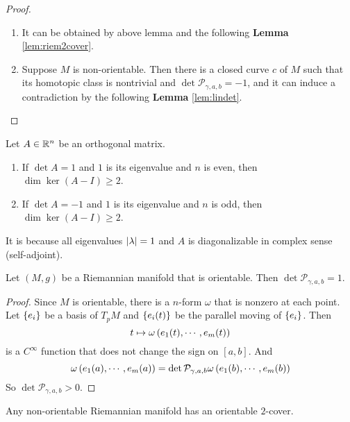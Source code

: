 \begin{enumerate}[label=\Roman{*}.]
\begin{proof}
\begin{enumerate}[label=(\arabic{*})]
			\item It can be obtained by above lemma and the following \textbf{Lemma} \ref{lem:riem2cover}.

			\item Suppose $M$ is non-orientable. Then there is a closed curve $c$ of $M$ such that its homotopic class is nontrivial and $\det \mathcal{P}_{\gamma,a,b} = -1$, and it can induce a contradiction by the following \textbf{Lemma} \ref{lem:lindet}.
		\end{enumerate}
	\end{proof}

	\begin{lem}\label{lem:lindet}
		Let $A \in \mathbb{R}^{n}$ be an orthogonal matrix.
		\begin{enumerate}[label=(\arabic{*})]
			\item If $\det A = 1$ and $1$ is its eigenvalue and $n$ is even, then $\dim \ker (A -I) \geq 2$. 
			\item If $\det A = -1$ and $1$ is its eigenvalue and $n$ is odd, then $\dim \ker (A - I) \geq 2$.
		\end{enumerate}
	\end{lem}
	\begin{rmk}
		It is because all eigenvalues $\left\lvert\lambda\right\lvert= 1$ and $A$ is diagonalizable in complex sense (self-adjoint).
	\end{rmk}

	\begin{lem}\label{lem:riemorein}
		Let $(M,g)$ be a Riemannian manifold that is orientable. Then $\det \mathcal{P}_{\gamma,a,b} = 1$.
	\end{lem}
	\begin{proof}
		Since $M$ is orientable, there is a $n$-form $\omega$ that is nonzero at each point. Let $\left\{e_i\right\}$ be a basis of $T_pM$ and $\left\{e_i(t)\right\}$ be the parallel moving of $\left\{e_i\right\}$. Then
		\begin{equation*}
			t \mapsto \omega\left(e_1(t),\cdots,e_m(t)\right)
		\end{equation*}
		is a $C^\infty$ function that does not change the sign on $[a,b]$. And
		\begin{equation*}
			\omega\left(e_1(a),\cdots,e_m(a)\right) = \det \mathcal{P}_{\gamma,a,b}\omega\left(e_1(b),\cdots,e_m(b)\right)
		\end{equation*}
		So $\det \mathcal{P}_{\gamma,a,b} > 0$.
	\end{proof}

	\begin{lem}\label{lem:riem2cover}
		Any non-orientable Riemannian manifold has an orientable $2$-cover.
	\end{lem}


\end{enumerate}

